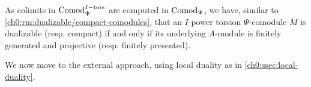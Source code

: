 \begin{remark}
    \label{ch0:rm:dualizable/compact-torsion-comodule}
    As colimits in $\mathrm{Comod}_\Psi^{I-\mathrm{tors}}$ are computed in $\mathrm{Comod}_\Psi$, we have, similar to \cref{ch0:rm:dualizable/compact-comodules}, that an $I$-power torsion $\Psi$-comodule $M$ is dualizable (resp. compact) if and only if its underlying $A$-module is finitely generated and projective (resp. finitely presented). 
\end{remark}




We now move to the external approach, using local duality as in \cref{ch0:ssec:local-duality}. 

